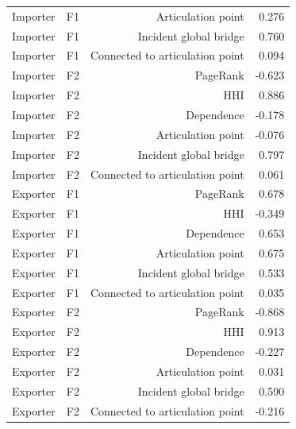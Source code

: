 \documentclass[pdftex,12pt,openright,a4paper,oneside]{book}
\begin{document}
\begin{longtable}{@{}p{}rrr@{}}
Importer & F1 & Articulation point & 0.276 \\

Importer & F1 & Incident global bridge & 0.760 \\

Importer & F1 & Connected to articulation point & 0.094 \\

Importer & F2 & PageRank & -0.623 \\

Importer & F2 & HHI & 0.886 \\

Importer & F2 & Dependence & -0.178 \\

Importer & F2 & Articulation point & -0.076 \\

Importer & F2 & Incident global bridge & 0.797 \\

Importer & F2 & Connected to articulation point & 0.061 \\

Exporter & F1 & PageRank & 0.678 \\

Exporter & F1 & HHI & -0.349 \\

Exporter & F1 & Dependence & 0.653 \\

Exporter & F1 & Articulation point & 0.675 \\

Exporter & F1 & Incident global bridge & 0.533 \\

Exporter & F1 & Connected to articulation point & 0.035 \\

Exporter & F2 & PageRank & -0.868 \\

Exporter & F2 & HHI & 0.913 \\

Exporter & F2 & Dependence & -0.227 \\

Exporter & F2 & Articulation point & 0.031 \\

Exporter & F2 & Incident global bridge & 0.590 \\

Exporter & F2 & Connected to articulation point & -0.216 \\

\bottomrule\end{longtable}
\end{document}
